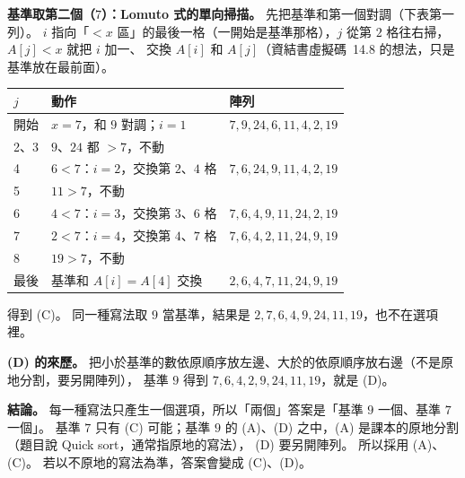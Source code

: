 \begin{pastsoln}
\textbf{基準取第二個（$7$）：Lomuto 式的單向掃描。} 先把基準和第一個對調（下表第一列）。
$i$ 指向「$< x$ 區」的最後一格（一開始是基準那格），$j$ 從第 $2$ 格往右掃，$A[j] < x$ 就把 $i$ 加一、
交換 $A[i]$ 和 $A[j]$（資結書虛擬碼~14.8 的想法，只是基準放在最前面）。
\begin{center}
\small
\begin{tabular}{lll}
\toprule
$j$ & 動作 & 陣列 \\
\midrule
開始 & $x = 7$，和 $9$ 對調；$i = 1$ & $7, 9, 24, 6, 11, 4, 2, 19$ \\
2、3 & $9$、$24$ 都 $> 7$，不動 & \\
4 & $6 < 7$：$i = 2$，交換第 $2$、$4$ 格 & $7, 6, 24, 9, 11, 4, 2, 19$ \\
5 & $11 > 7$，不動 & \\
6 & $4 < 7$：$i = 3$，交換第 $3$、$6$ 格 & $7, 6, 4, 9, 11, 24, 2, 19$ \\
7 & $2 < 7$：$i = 4$，交換第 $4$、$7$ 格 & $7, 6, 4, 2, 11, 24, 9, 19$ \\
8 & $19 > 7$，不動 & \\
最後 & 基準和 $A[i] = A[4]$ 交換 & $2, 6, 4, 7, 11, 24, 9, 19$ \\
\bottomrule
\end{tabular}
\end{center}
得到 (C)。 同一種寫法取 $9$ 當基準，結果是 $2, 7, 6, 4, 9, 24, 11, 19$，也不在選項裡。

\textbf{(D) 的來歷。} 把小於基準的數依原順序放左邊、大於的依原順序放右邊（不是原地分割，要另開陣列），
基準 $9$ 得到 $7, 6, 4, 2, 9, 24, 11, 19$，就是 (D)。

\textbf{結論。} 每一種寫法只產生一個選項，所以「兩個」答案是「基準 $9$ 一個、基準 $7$ 一個」。 基準 $7$
只有 (C) 可能；基準 $9$ 的 (A)、(D) 之中，(A) 是課本的原地分割（題目說 Quick sort，通常指原地的寫法），
(D) 要另開陣列。 所以採用 (A)、(C)。 若以不原地的寫法為準，答案會變成 (C)、(D)。
\end{pastsoln}
